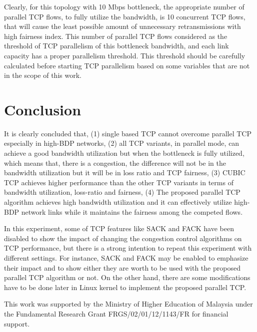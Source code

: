 \documentclass[a4paper, conference]{IEEEtran}
\begin{document}
Clearly, for this topology with 10 Mbps bottleneck, the appropriate number of parallel TCP flows, to fully utilize the bandwidth, is 10 concurrent TCP flows, that will cause the least possible amount of unnecessary retransmissions with high fairness index. This number of parallel TCP flows considered as the threshold of TCP parallelism of this bottleneck bandwidth, and each link capacity has a proper parallelism threshold. This threshold should be carefully calculated before starting TCP parallelism based on some variables that are not in the scope of this work.

\section{Conclusion}

It is clearly concluded that, (1) single based TCP cannot overcome parallel TCP especially in high-BDP networks, (2) all TCP variants, in parallel mode, can achieve a good bandwidth utilization but when the bottleneck is fully utilized, which means that, there is a congestion, the difference will not be in the bandwidth utilization but it will be in loss ratio and TCP fairness, (3) CUBIC TCP achieves higher performance than the other TCP variants in terms of bandwidth utilization, loss-ratio and fairness, (4) The proposed parallel TCP algorithm achieves high bandwidth utilization and it can effectively utilize high-BDP network links while it maintains the fairness among the competed flows.

In this experiment, some of TCP features like SACK and FACK have been disabled to show the impact of changing the congestion control algorithms on TCP performance, but there is a strong intention to repeat this experiment with different settings. For instance, SACK and FACK may be enabled to emphasize their impact and to show either they are worth to be used with the proposed parallel TCP algorithm or not. On the other hand, there are some modifications have to be done later in Linux kernel to implement the proposed parallel TCP.

This work was supported by the Ministry of Higher Education of Malaysia under the Fundamental Research Grant FRGS/02/01/12/1143/FR for financial support.

\begingroup
\let\itshape\upshape
\end{document}
